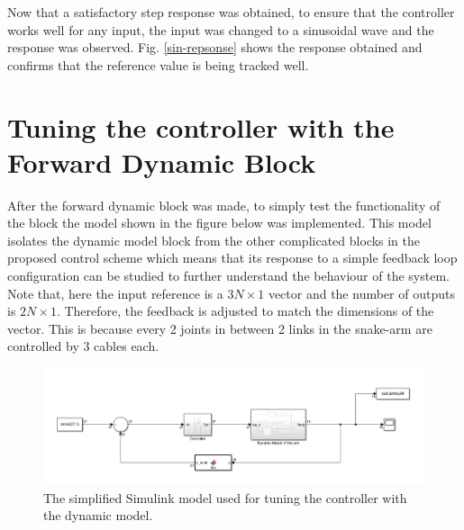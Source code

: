 \documentclass[a4paper,12pt]{report}
\begin{document}
Now that a satisfactory step response was obtained, to ensure that the controller works well for any input, the input was changed to a sinusoidal wave and the response was observed. Fig. \ref{sin-repsonse} shows the response obtained and confirms that the reference value is being tracked well.


\section{Tuning the controller with the Forward Dynamic Block}

After the forward dynamic block was made, to simply test the functionality of the block the model shown in the figure below was implemented. This model isolates the dynamic model block from the other complicated blocks in the proposed control scheme which means that its response to a simple feedback loop configuration can be studied to further understand the behaviour of the system. Note that, here the input reference is a $ 3N\times1 $ vector and the number of outputs is $ 2N\times1 $. Therefore, the feedback is adjusted to match the dimensions of the vector. This is because every 2 joints in between 2 links in the snake-arm are controlled by 3 cables each.

\begin{figure}[H]
	\includegraphics[width=\textwidth]{images/testing-dynamic-model.png}
	\caption{The simplified Simulink model used for tuning the controller with the dynamic model.}
\end{figure}
\end{document}

